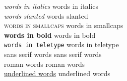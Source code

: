 \documentclass{article}
\begin{document}
\textit{words in italics} words in italics\\
\textsl{words slanted} words slanted\\
\textsc{words in smallcaps} words in smallcaps\\
\textbf{words in bold} words in bold\\
\texttt{words in teletype} words in teletype\\
\textsf{sans serif words} sans serif words\\
\textrm{roman words} roman words\\
\underline{underlined words} underlined words
\end{document}
